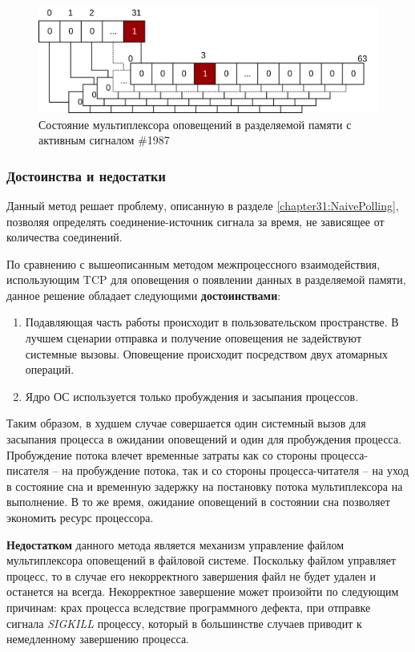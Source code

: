 \begin{figure}[!h]
\caption{Состояние мультиплексора оповещений в разделяемой памяти с активным сигналом \#1987}
\label{chapter31:Mux1987State}
\includegraphics[width=\textwidth]{../../graphics/schemes/futexready}
\end{figure}

\subsubsection{Достоинства и недостатки}

Данный метод решает проблему, описанную в разделе \ref{chapter31:NaivePolling}, позволяя определять соединение-источник сигнала за время, не зависящее от количества соединений.

По сравнению с вышеописанным методом межпроцессного взаимодействия, использующим TCP для оповещения о появлении данных в разделяемой памяти, данное решение обладает следующими \textbf{достоинствами}:
\begin{enumerate}
\item Подавляющая часть работы происходит в пользовательском пространстве. В лучшем сценарии отправка и получение оповещения не задействуют системные вызовы. Оповещение происходит посредством двух атомарных операций.
\item Ядро ОС используется только пробуждения и засыпания процессов.
\end{enumerate}

Таким образом, в худшем случае совершается один системный вызов для засыпания процесса в ожидании оповещений и один для пробуждения процесса. Пробуждение потока влечет временные затраты как со стороны процесса-писателя -- на пробуждение потока, так и со стороны процесса-читателя -- на уход в состояние сна и временную задержку на постановку потока мультиплексора на выполнение. В то же время, ожидание оповещений в состоянии сна позволяет экономить ресурс процессора.

\textbf{Недостатком} данного метода является механизм управление файлом мультиплексора оповещений в файловой системе. Поскольку файлом управляет процесс, то в случае его некорректного завершения файл не будет удален и останется на всегда. Некорректное завершение может произойти по следующим причинам: крах процесса вследствие программного дефекта, при отправке сигнала \textit{SIGKILL} процессу, который в большинстве случаев приводит к немедленному завершению процесса.

